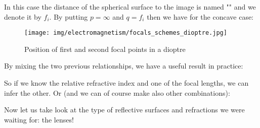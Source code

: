 	In this case the distance of the spherical surface to the image is named "" and we denote it by $f_i$. By putting $p=\infty$ and $q=f_i$ then we have for the concave case:
	
	\begin{figure}[H]
		\centering
		\texttt{[image: img/electromagnetism/focals\_schemes\_dioptre.jpg]}
		\caption{Position of first and second focal points in a dioptre}
	\end{figure}
	By mixing the two previous relationships, we have a useful result in practice:
	
	So if we know the relative refractive index and one of the focal lengths, we can infer the other. Or (and we can of course make also other combinations):
	
	Now let us take look at the type of reflective surfaces and refractions we were waiting for: the lenses!
	
